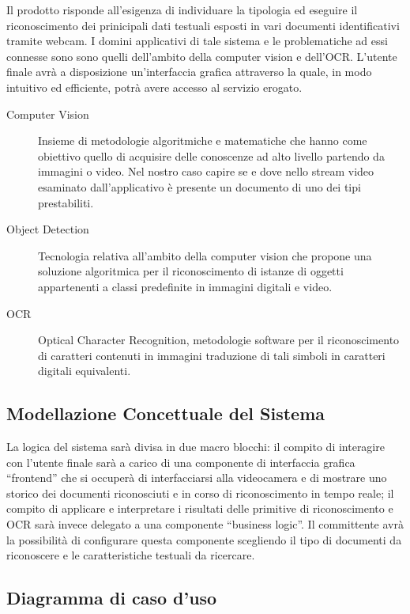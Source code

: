 \documentclass[12pt,a4paper]{article}
\begin{document}
Il prodotto risponde all'esigenza di individuare la tipologia ed
eseguire il riconoscimento dei prinicipali dati testuali esposti in vari
documenti identificativi tramite webcam. I domini applicativi di tale
sistema e le problematiche ad essi connesse sono sono quelli dell'ambito
della computer vision e dell'OCR. L'utente finale avrà a disposizione
un'interfaccia grafica attraverso la quale, in modo intuitivo ed
efficiente, potrà avere accesso al servizio erogato.

\begin{description}
    \item[Computer Vision] Insieme di metodologie algoritmiche e
        matematiche che hanno come obiettivo quello di acquisire delle
        conoscenze ad alto livello partendo da immagini o video. Nel
        nostro caso capire se e dove nello stream video esaminato
        dall'applicativo è presente un documento di uno dei tipi
        prestabiliti.
    \item[Object Detection] Tecnologia relativa all'ambito della
        computer vision che propone una soluzione algoritmica per il
        riconoscimento di istanze di oggetti appartenenti a classi
        predefinite in immagini digitali e video.
    \item[OCR] Optical Character Recognition, metodologie software per
        il riconoscimento di caratteri contenuti in immagini traduzione
        di tali simboli in caratteri digitali equivalenti.
\end{description}

\subsection{Modellazione Concettuale del Sistema}

La logica del sistema sarà divisa in due macro blocchi: il compito di
interagire con l'utente finale sarà a carico di una componente di
interfaccia grafica ``frontend'' che si occuperà di interfacciarsi alla
videocamera e di mostrare uno storico dei documenti riconosciuti e in
corso di riconoscimento in tempo reale; il compito di applicare e
interpretare i risultati delle primitive di riconoscimento e OCR sarà
invece delegato a una componente ``business logic''. Il committente
avrà la possibilità di configurare questa componente scegliendo il tipo
di documenti da riconoscere e le caratteristiche testuali da ricercare.

\subsection{Diagramma di caso d'uso}
\end{document}
